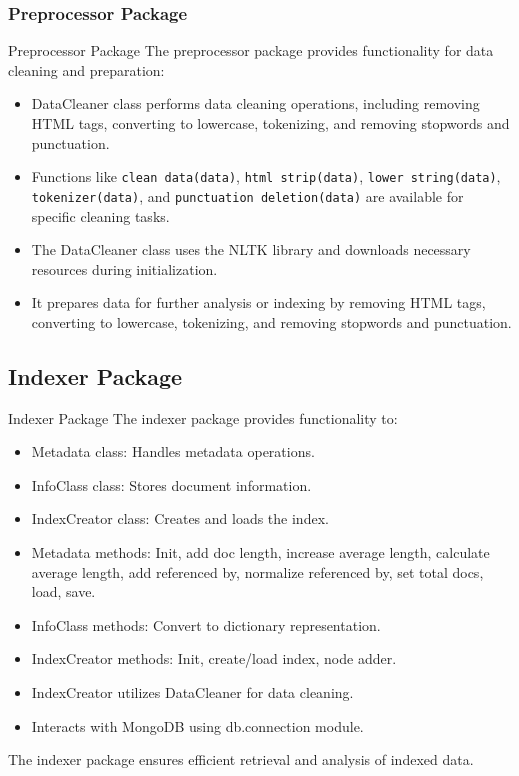 \documentclass{beamer}
\begin{document}
\subsubsection{Preprocessor Package}
\begin{frame}{Preprocessor Package}
    The preprocessor package provides functionality for data cleaning and preparation:
    
    \begin{itemize}
    \item DataCleaner class performs data cleaning operations, including removing HTML tags, converting to lowercase, tokenizing, and removing stopwords and punctuation.
    \item Functions like \texttt{clean data(data)}, \texttt{html strip(data)}, \texttt{lower string(data)}, \texttt{tokenizer(data)}, and \texttt{punctuation deletion(data)} are available for specific cleaning tasks.
    \item The DataCleaner class uses the NLTK library and downloads necessary resources during initialization.
    \item It prepares data for further analysis or indexing by removing HTML tags, converting to lowercase, tokenizing, and removing stopwords and punctuation.
    \end{itemize}

\end{frame}
    

\subsection{Indexer Package}

\begin{frame}{Indexer Package}
    The indexer package provides functionality to:
    \begin{itemize}
    \item Metadata class: Handles metadata operations.
    \item InfoClass class: Stores document information.
    \item IndexCreator class: Creates and loads the index.
    \item Metadata methods: Init, add doc length, increase average length, calculate average length, add referenced by, normalize referenced by, set total docs, load, save.
    \item InfoClass methods: Convert to dictionary representation.
    \item IndexCreator methods: Init, create/load index, node adder.
    \item IndexCreator utilizes DataCleaner for data cleaning.
    \item Interacts with MongoDB using db.connection module.
    \end{itemize}
    The indexer package ensures efficient retrieval and analysis of indexed data.

\end{frame}
\end{document}
